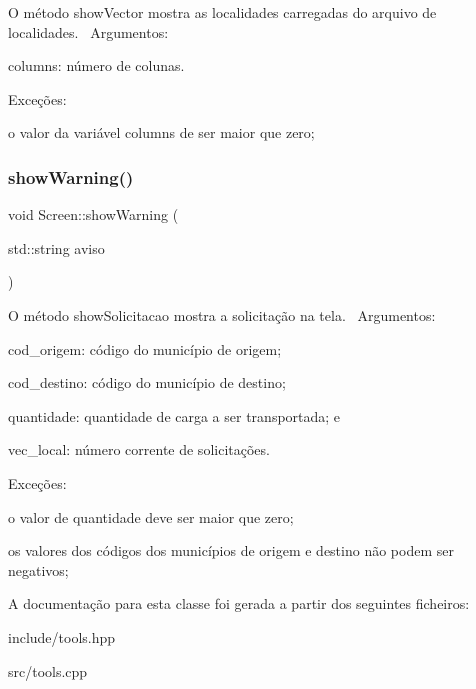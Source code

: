 O método show\+Vector mostra as localidades carregadas do arquivo de localidades.~\newline
Argumentos\+:
\begin{DoxyItemize}
\item columns\+: número de colunas.
\end{DoxyItemize}

Exceções\+:
\begin{DoxyItemize}
\item o valor da variável columns de ser maior que zero;
\end{DoxyItemize}\mbox{\label{classScreen_a5fc8c4449368a8507f03bf3243677f1e}} 
\subsubsection{\texorpdfstring{show\+Warning()}{showWarning()}}
{\footnotesize\ttfamily void Screen\+::show\+Warning (\begin{DoxyParamCaption}\item[{std\+::string}]{aviso }\end{DoxyParamCaption})}

O método show\+Solicitacao mostra a solicitação na tela.~\newline
Argumentos\+:
\begin{DoxyItemize}
\item cod\+\_\+origem\+: código do município de origem;
\item cod\+\_\+destino\+: código do município de destino;
\item quantidade\+: quantidade de carga a ser transportada; e
\item vec\+\_\+local\+: número corrente de solicitações.
\end{DoxyItemize}

Exceções\+:
\begin{DoxyItemize}
\item o valor de quantidade deve ser maior que zero;
\item os valores dos códigos dos municípios de origem e destino não podem ser negativos;
\end{DoxyItemize}

A documentação para esta classe foi gerada a partir dos seguintes ficheiros\+:\begin{DoxyCompactItemize}
\item 
include/tools.\+hpp\item 
src/tools.\+cpp\end{DoxyCompactItemize}
